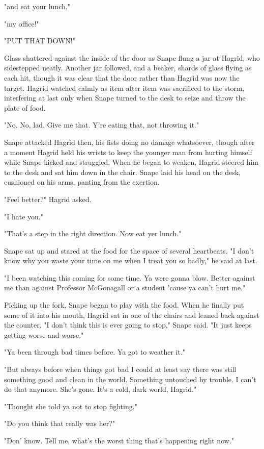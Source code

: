 "{\el}and eat your lunch."

"{\el}my office!"

"PUT THAT DOWN!"

Glass shattered against the inside of the door as Snape flung a jar at Hagrid, who sidestepped neatly. Another jar followed, and a beaker, shards of glass flying as each hit, though it was clear that the door rather than Hagrid was now the target. Hagrid watched calmly as item after item was sacrificed to the storm, interfering at last only when Snape turned to the desk to seize and throw the plate of food.

"No. No, lad. Give me that. Y're eating that, not throwing it."

Snape attacked Hagrid then, his fists doing no damage whatsoever, though after a moment Hagrid held his wrists to keep the younger man from hurting himself while Snape kicked and struggled. When he began to weaken, Hagrid steered him to the desk and sat him down in the chair. Snape laid his head on the desk, cushioned on his arms, panting from the exertion.

"Feel better?" Hagrid asked.

"I hate you."

"That's a step in the right direction. Now eat yer lunch."

Snape sat up and stared at the food for the space of several heartbeats. "I don't know why you waste your time on me when I treat you so badly," he said at last.

"I been watching this coming for some time. Ya were gonna blow. Better against me than against Professor McGonagall or a student 'cause ya can't hurt me."

Picking up the fork, Snape began to play with the food. When he finally put some of it into his mouth, Hagrid sat in one of the chairs and leaned back against the counter. "I don't think this is ever going to stop," Snape said. "It just keeps getting worse and worse."

"Ya been through bad times before. Ya got to weather it."

"But always before when things got bad I could at least say there was still something good and clean in the world. Something untouched by trouble. I can't do that anymore. She's gone. It's a cold, dark world, Hagrid."

"Thought she told ya not to stop fighting."

"Do you think that really was her?"

"Don' know. Tell me, what's the worst thing that's happening right now."

